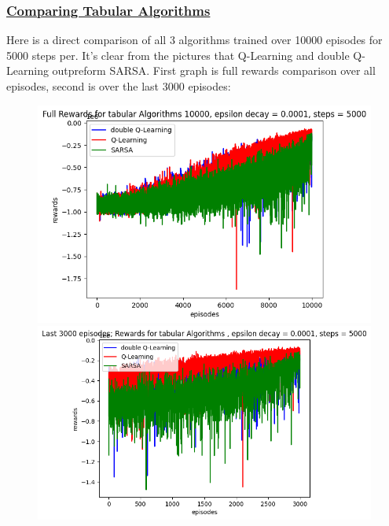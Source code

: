 \documentclass[twoside,11pt]{article}
\begin{document}
\subsubsection{\href{https://github.com/duoduocai-dot/csc498-project/blob/main/tabular_experiments.py\#L10}{Comparing Tabular Algorithms}}
Here is a direct comparison of all 3 algorithms trained over 10000 episodes for 5000 steps per. It's clear from the pictures that Q-Learning and double Q-Learning outpreform SARSA. First graph is full rewards comparison over all episodes, second is over the last 3000 episodes:
\begin{figure}[H]
\includegraphics[scale=0.3]{Full_Rewards_Comparison1}
\includegraphics[scale=0.3]{Last_3000_rewards_comparison1}
\centering
\end{figure}
\end{document}
